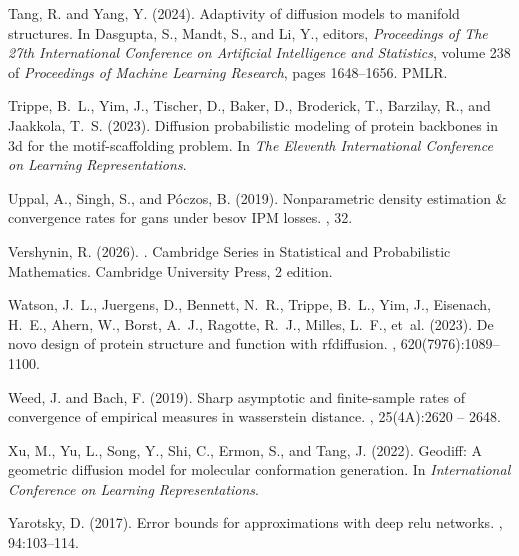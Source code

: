 \documentclass[12pts]{article}
\begin{document}
\begin{thebibliography}{}
Tang, R. and Yang, Y. (2024).
\newblock Adaptivity of diffusion models to manifold structures.
\newblock In Dasgupta, S., Mandt, S., and Li, Y., editors, {\em Proceedings of The 27th International Conference on Artificial Intelligence and Statistics}, volume 238 of {\em Proceedings of Machine Learning Research}, pages 1648--1656. PMLR.

Trippe, B.~L., Yim, J., Tischer, D., Baker, D., Broderick, T., Barzilay, R., and Jaakkola, T.~S. (2023).
\newblock Diffusion probabilistic modeling of protein backbones in 3d for the motif-scaffolding problem.
\newblock In {\em The Eleventh International Conference on Learning Representations}.

Uppal, A., Singh, S., and P{\'o}czos, B. (2019).
\newblock Nonparametric density estimation \& convergence rates for gans under besov {IPM} losses.
, 32.

Vershynin, R. (2026).
.
\newblock Cambridge Series in Statistical and Probabilistic Mathematics. Cambridge University Press, 2 edition.

Watson, J.~L., Juergens, D., Bennett, N.~R., Trippe, B.~L., Yim, J., Eisenach, H.~E., Ahern, W., Borst, A.~J., Ragotte, R.~J., Milles, L.~F., et~al. (2023).
\newblock De novo design of protein structure and function with rfdiffusion.
, 620(7976):1089--1100.

Weed, J. and Bach, F. (2019).
\newblock Sharp asymptotic and finite-sample rates of convergence of empirical measures in wasserstein distance.
, 25(4A):2620 -- 2648.

Xu, M., Yu, L., Song, Y., Shi, C., Ermon, S., and Tang, J. (2022).
\newblock Geodiff: A geometric diffusion model for molecular conformation generation.
\newblock In {\em International Conference on Learning Representations}.

Yarotsky, D. (2017).
\newblock Error bounds for approximations with deep relu networks.
, 94:103--114.

\end{thebibliography}
\end{document}
